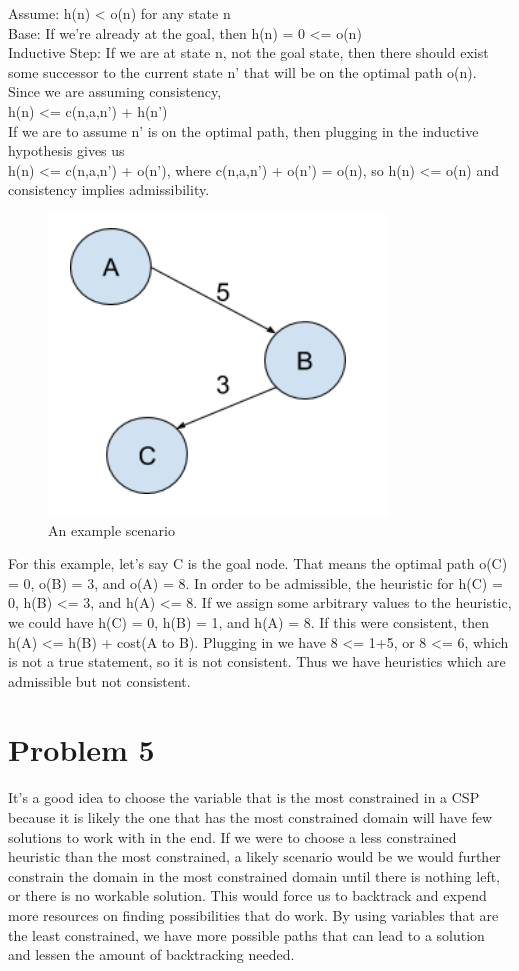 \documentclass[12pt]{article}
\begin{document}
		\noindent Assume: h(n) < o(n) for any state n \\
		Base: If we’re already at the goal, then h(n) = 0 <= o(n) \\
		
		\noindent Inductive Step: If we are at state n, not the goal state, then there should exist some successor to the current state n’ that will be on the optimal path o(n). Since we are assuming consistency, \\
		
		\noindent h(n) <= c(n,a,n’) + h(n’) \\
		
		\noindent If we are to assume n’ is on the optimal path, then plugging in the inductive hypothesis gives us \\
		
		\noindent h(n) <= c(n,a,n’) + o(n’), where c(n,a,n’) + o(n’) = o(n), so h(n) <= o(n) and consistency implies admissibility.
		
		\begin{figure}[!htb]
			\centering
			\includegraphics[width=.5\textwidth]{Question4.png}
			\caption{An example scenario}
		\end{figure}
		\noindent For this example, let’s say C is the goal node. That means the optimal path o(C) = 0, o(B) = 3, and o(A) = 8. In order to be admissible, the heuristic for h(C) = 0, h(B) <= 3, and h(A) <= 8. If we assign some arbitrary values to the heuristic, we could have h(C) = 0, h(B) = 1, and h(A) = 8. If this were consistent, then h(A) <= h(B) + cost(A to B). Plugging in we have 8 <= 1+5, or 8 <= 6, which is not a true statement, so it is not consistent. Thus we have heuristics which are admissible but not consistent.
		
	\section*{Problem 5}
		It’s a good idea to choose the variable that is the most constrained in a CSP because it is likely the one that has the most constrained domain will have few solutions to work with in the end. If we were to choose a less constrained heuristic than the most constrained, a likely scenario would be we would further constrain the domain in the most constrained domain until there is nothing left, or there is no workable solution. This would force us to backtrack and expend more resources on finding possibilities that do work. By using variables that are the least constrained, we have more possible paths that can lead to a solution and lessen the amount of backtracking needed.
		
\end{document}
